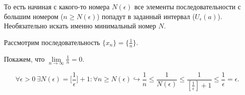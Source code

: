 \begin{note}
    То есть начиная с какого-то номера $N (\epsilon)$ все элементы последовательности с большим номером ($n \geq N (\epsilon)$) попадут в заданный интервал ($U_{\epsilon}(a)$). Необязательно искать именно минимальный номер $N$.
\end{note}
\begin{example}
    Рассмотрим последовательность $\{ x_{n} \} = \{ \frac{1}{n} \}.$
    
    Покажем, что $\lim\limits_{n\to \infty} \frac{1}{n} = 0.$

    $$\forall \epsilon > 0 \  \exists N(\epsilon) = \bigg[ \frac{1}{\epsilon} \bigg] + 1: \forall n \geq N(\epsilon) \hookrightarrow \frac{1}{n} \leq \frac{1}{N(\epsilon)} \leq \frac{1}{[ \frac{1}{\epsilon}] + 1} \leq \frac{1}{\epsilon} = \epsilon.$$
     
\end{example}